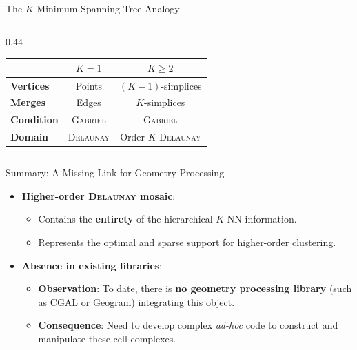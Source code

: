 \documentclass[A4,svgnames,9pt,aspectratio=169]{beamer}
\begin{document}
\begin{frame}{The $K$-Minimum Spanning Tree Analogy}
\begin{columns}[c, onlytextwidth]
\begin{column}{0.44\textwidth}
\begin{center}
                \vspace{0.5cm}
                \small
                \renewcommand{\arraystretch}{1.5}
                \begin{tabular}{lcc}
                    \toprule
                    & \textbf{$K = 1$} & \textbf{$K \ge 2$} \\
                    \midrule
                    \textbf{Vertices} & Points & $(K-1)$-simplices \\
                    \textbf{Merges} & Edges & $K$-simplices \\
                    \textbf{Condition} & \textsc{Gabriel} & \textsc{Gabriel} \\
                    \textbf{Domain} & \textsc{Delaunay} & Order-$K$ \textsc{Delaunay} \\
                    \bottomrule
                \end{tabular}
            \end{center}
        \end{column}
    \end{columns}
\end{frame}

\begin{frame}{Summary: A Missing Link for Geometry Processing}
    \begin{itemize}
        \setlength{\itemsep}{12pt}
        \item \textbf{Higher-order \textsc{Delaunay} mosaic}:
        \begin{itemize}
            \item Contains the \textbf{entirety} of the hierarchical $K$-NN information.
            \item Represents the optimal and sparse support for higher-order clustering.
        \end{itemize}
        
        \item \textbf{Absence in existing libraries}:
        \begin{itemize}
            \item \textbf{Observation}: To date, there is \textbf{no geometry processing library} (such as CGAL or Geogram) integrating this object.
            \item \textbf{Consequence}: Need to develop complex \emph{ad-hoc} code to construct and manipulate these cell complexes.
        \end{itemize}
    \end{itemize}
\end{frame}
\end{document}
